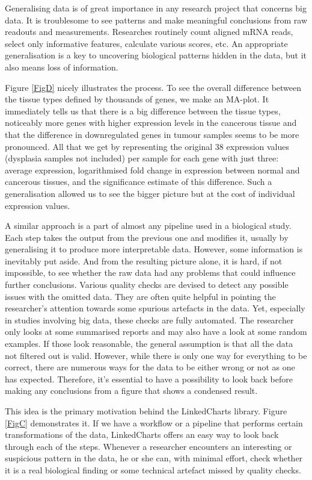 \documentclass[twocolumn,10pt]{article}
\begin{document}
Generalising data is of great importance in any research project that concerns big data. It is troublesome to see patterns and make meaningful conclusions from raw readouts and measurements. Researches routinely count aligned mRNA reads, select only informative features, calculate various scores, etc. An appropriate generalisation is a key to uncovering biological patterns hidden in the data, but it also means loss of information.

Figure \ref{FigD} nicely illustrates the process. To see the overall difference between the tissue types defined by thousands of genes, we make an MA-plot. It immediately tells us that there is a big difference between the tissue types, noticeably more genes with higher expression levels in the cancerous tissue and that the difference in downregulated genes in tumour samples seems to be more pronounced. All that we get by representing the original 38 expression values (dysplasia samples not included) per sample for each gene with just three: average expression, logarithmised fold change in expression between normal and cancerous tissues, and the significance estimate of this difference. Such a generalisation allowed us to see the bigger picture but at the cost of individual expression values.

A similar approach is a part of almost any pipeline used in a biological study. Each step takes the output from the previous one and modifies it, usually by generalising it to produce more interpretable data. However, some information is inevitably put aside. And from the resulting picture alone, it is hard, if not impossible, to see whether the raw data had any problems that could influence further conclusions. Various quality checks are devised to detect any possible issues with the omitted data. They are often quite helpful in pointing the researcher's attention towards some spurious artefacts in the data. Yet, especially in studies involving big data, these checks are fully automated. The researcher only looks at some summarised reports and may also have a look at some random examples. If those look reasonable, the general assumption is that all the data not filtered out is valid. However, while there is only one way for everything to be correct, there are numerous ways for the data to be either wrong or not as one has expected. Therefore, it's essential to have a possibility to look back before making any conclusions from a figure that shows a condensed result.

This idea is the primary motivation behind the LinkedCharts library. Figure \ref{FigC} demonstrates it. If we have a workflow or a pipeline that performs certain transformations of the data, LinkedCharts offers an easy way to look back through each of the steps. Whenever a researcher encounters an interesting or suspicious pattern in the data, he or she can, with minimal effort, check whether it is a real biological finding or some technical artefact missed by quality checks. 
\end{document}
